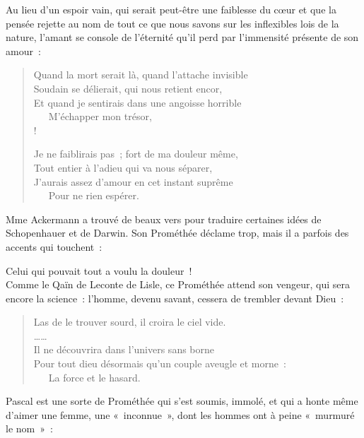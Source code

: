 \documentclass[french,twoside]{book} %
\begin{document}
\noindent Au lieu d’un espoir vain, qui serait peut-être une faiblesse du cœur et que la pensée rejette au nom de tout ce que nous savons sur les inflexibles lois de la nature, l’amant se console de l’éternité qu’il perd par l’immensité présente de son amour :\par


\begin{verse}
Quand la mort serait là, quand l’attache invisible\\
Soudain se délierait, qui nous retient encor,\\
Et quand je sentirais dans une angoisse horrible\\
   M’échapper mon trésor,\\!

Je ne faiblirais pas ; fort de ma douleur même,\\
Tout entier à l’adieu qui va nous séparer,\\
J’aurais assez d’amour en cet instant suprême\\
   Pour ne rien espérer.\\
\end{verse}

\noindent Mme Ackermann a trouvé de beaux vers pour traduire certaines idées de Schopenhauer et de Darwin. Son Prométhée déclame trop, mais il a parfois des accents qui touchent :\par

Celui qui pouvait tout a voulu la douleur !\\

\noindent Comme le Qaïn de Leconte de Lisle, ce Prométhée attend son vengeur, qui sera encore la science : l’homme, devenu savant, cessera de trembler devant Dieu :\par


\begin{verse}
Las de le trouver sourd, il croira le ciel vide.\\
……\\
Il ne découvrira dans l’univers sans borne\\
Pour tout dieu désormais qu’un couple aveugle et morne :\\
   La force et le hasard.\\
\end{verse}

\noindent Pascal est une sorte de Prométhée qui s’est soumis, immolé, et qui a honte même d’aimer une femme, une « inconnue », dont les hommes ont à peine « murmuré le nom » :\par
\end{document}
